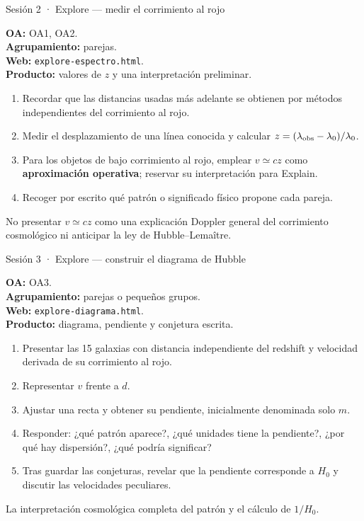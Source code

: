 \begin{guiaficha}{Sesión 2 · Explore --- medir el corrimiento al rojo}
\begin{guiameta}
\textbf{OA:} OA1, OA2.\\
\textbf{Agrupamiento:} parejas.\\
\textbf{Web:} \texttt{explore-espectro.html}.\\
\textbf{Producto:} valores de $z$ y una interpretación preliminar.
\end{guiameta}
\begin{enumerate}[leftmargin=*,itemsep=2pt]
\item {} Recordar que las distancias usadas más adelante se obtienen por métodos independientes del corrimiento al rojo.
\item {} Medir el desplazamiento de una línea conocida y calcular $z=(\lambda_{\rm obs}-\lambda_0)/\lambda_0$.
\item {} Para los objetos de bajo corrimiento al rojo, emplear $v\simeq cz$ como \textbf{aproximación operativa}; reservar su interpretación para Explain.
\item {} Recoger por escrito qué patrón o significado físico propone cada pareja.
\end{enumerate}
 No presentar $v\simeq cz$ como una explicación Doppler general del corrimiento cosmológico ni anticipar la ley de Hubble--Lemaître.
\end{guiaficha}

\begin{guiaficha}{Sesión 3 · Explore --- construir el diagrama de Hubble}
\begin{guiameta}
\textbf{OA:} OA3.\\
\textbf{Agrupamiento:} parejas o pequeños grupos.\\
\textbf{Web:} \texttt{explore-diagrama.html}.\\
\textbf{Producto:} diagrama, pendiente y conjetura escrita.
\end{guiameta}
\begin{enumerate}[leftmargin=*,itemsep=2pt]
\item {} Presentar las 15 galaxias con distancia independiente del redshift y velocidad derivada de su corrimiento al rojo.
\item {} Representar $v$ frente a $d$.
\item {} Ajustar una recta y obtener su pendiente, inicialmente denominada solo $m$.
\item {} Responder: ¿qué patrón aparece?, ¿qué unidades tiene la pendiente?, ¿por qué hay dispersión?, ¿qué podría significar?
\item {} Tras guardar las conjeturas, revelar que la pendiente corresponde a $H_0$ y discutir las velocidades peculiares.
\end{enumerate}
 La interpretación cosmológica completa del patrón y el cálculo de $1/H_0$.
\end{guiaficha}

